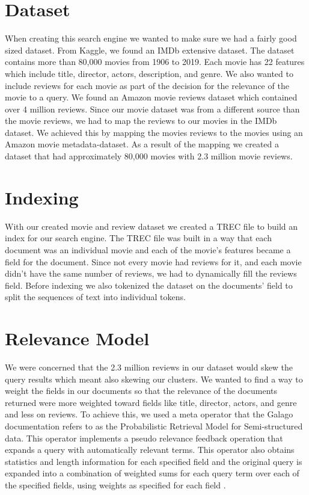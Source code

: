 \documentclass[sigconf]{acmart}
\begin{document}
\section{Dataset}
When creating this search engine we wanted to make sure we had a fairly good sized dataset. From Kaggle, we found an IMDb extensive dataset. The dataset contains more than 80,000 movies from 1906 to 2019. Each movie has 22 features which include title, director, actors, description, and genre. We also wanted to include reviews for each movie as part of the decision for the relevance of the movie to a query. We found an Amazon movie reviews dataset which contained over 4 million reviews. Since our movie dataset was from a different source than the movie reviews, we had to map the reviews to our movies in the IMDb dataset. We achieved this by mapping the movies reviews to the movies using an Amazon movie metadata-dataset. As a result of the mapping we created a dataset that had approximately 80,000 movies with 2.3 million movie reviews.


\section{Indexing}
With our created movie and review dataset we created a TREC file to build an index for our search engine. The TREC file was built in a way that each document was an individual movie and each of the movie's features became a field for the document. Since not every movie had reviews for it, and each movie didn't have the same number of reviews, we had to dynamically fill the reviews field. Before indexing we also tokenized the dataset on the documents' field to split the sequences of text into individual tokens.

\section{Relevance Model}
We were concerned that the 2.3 million reviews in our dataset would skew the query results which meant also skewing our clusters. We wanted to find a way to weight the fields in our documents so that the relevance of the documents returned were more weighted toward fields like title, director, actors, and genre and less on reviews. To achieve this, we used a meta operator that the Galago documentation refers to as the Probabilistic Retrieval Model for Semi-structured data. This operator implements a pseudo relevance feedback operation that expands a query with automatically relevant terms. This operator also obtains statistics and length information for each specified field and the original query is expanded into a combination of weighted sums for each query term over each of the specified fields, using weights as specified for each field \cite{galago}.
\end{document}
